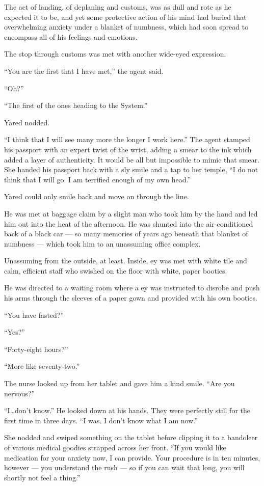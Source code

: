 The act of landing, of deplaning and customs, was as dull and rote as he expected it to be, and yet some protective action of his mind had buried that overwhelming anxiety under a blanket of numbness, which had soon spread to encompass all of his feelings and emotions.

The stop through customs was met with another wide-eyed expression.

``You are the first that I have met,'' the agent said.

``Oh?''

``The first of the ones heading to the System.''

Yared nodded.

``I think that I will see many more the longer I work here.'' The agent stamped his passport with an expert twist of the wrist, adding a smear to the ink which added a layer of authenticity. It would be all but impossible to mimic that smear. She handed his passport back with a sly smile and a tap to her temple, ``I do not think that I will go. I am terrified enough of my own head.''

Yared could only smile back and move on through the line.

He was met at baggage claim by a slight man who took him by the hand and led him out into the heat of the afternoon. He was shunted into the air-conditioned back of a black car — so many memories of years ago beneath that blanket of numbness — which took him to an unassuming office complex.

Unassuming from the outside, at least. Inside, ey was met with white tile and calm, efficient staff who swished on the floor with white, paper booties.

He was directed to a waiting room where a ey was instructed to disrobe and push his arms through the sleeves of a paper gown and provided with his own booties.

``You have fasted?''

``Yes?''

``Forty-eight hours?''

``More like seventy-two.''

The nurse looked up from her tablet and gave him a kind smile. ``Are you nervous?''

``I\ldots don't know.'' He looked down at his hands. They were perfectly still for the first time in three days. ``I was. I don't know what I am now.''

She nodded and swiped something on the tablet before clipping it to a bandoleer of various medical goodies strapped across her front. ``If you would like medication for your anxiety now, I can provide. Your procedure is in ten minutes, however — you understand the rush — so if you can wait that long, you will shortly not feel a thing.''


